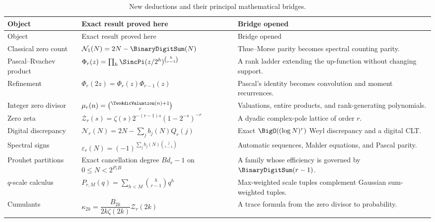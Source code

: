 \documentclass[11pt,oneside]{article}
\theoremstyle{definition}
\theoremstyle{remark}
\begin{document}
\begin{longtable}{@{}>{\raggedright\arraybackslash}p{}>{\raggedright\arraybackslash}p{}>{\raggedright\arraybackslash}p{}@{}}
\caption{New deductions and their principal mathematical bridges.}\label{p3:tab:result-map}\\
\toprule
Object & Exact result proved here & Bridge opened\\
\midrule
\endfirsthead
\toprule
Object & Exact result proved here & Bridge opened\\
\midrule
\endhead
Classical zero count
& $\mathcal N_1(N)=2N-\BinaryDigitSum(N)$
& Thue--Morse parity becomes spectral counting parity.\\

Pascal--Rvachev product
& $\Phi_r(z)=\prod_h\SincPi(z/2^h)^{\binom h{r-1}}$
& A rank ladder extending the up-function without changing support.\\

Refinement
& $\Phi_r(2z)=\Phi_r(z)\Phi_{r-1}(z)$
& Pascal's identity becomes convolution and moment recurrences.\\

Integer zero divisor
& $\mu_r(n)=\binom{\TwoAdicValuation(n)+1}{r}$
& Valuations, entire products, and rank-generating polynomials.\\

Zero zeta
& $\mathcal Z_r(s)=\zeta(s)2^{-(r-1)s}(1-2^{-s})^{-r}$
& A dyadic complex-pole lattice of order $r$.\\

Digital discrepancy
& $\mathcal N_r(N)=2N-\sum_jb_j(N)Q_r(j)$
& Exact $\BigO((\log N)^r)$ Weyl discrepancy and a digital CLT.\\

Spectral signs
& $\varepsilon_r(N)=(-1)^{\sum_jb_j(N)\binom j{r-1}}$
& Automatic sequences, Mahler equations, and Pascal parity.\\

Prouhet partitions
& Exact cancellation degree $Bd_r-1$ on $0\le N<2^{P_rB}$
& A family whose efficiency is governed by $\BinaryDigitSum(r-1)$.\\

$q$-scale calculus
& $P_{r,M}(q)=\sum_{h<M}\binom h{r-1}q^h$
& Max-weighted scale tuples complement Gaussian sum-weighted tuples.\\

Cumulants
& $\kappa_{2k}=\dfrac{B_{2k}}{2k\zeta(2k)}\mathcal Z_r(2k)$
& A trace formula from the zero divisor to probability.\\


\end{longtable}
\end{document}
